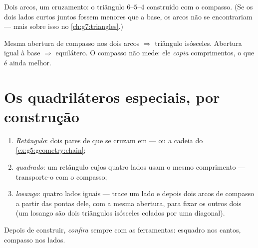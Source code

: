 \begin{omfigure}

{\small Dois arcos, um cruzamento: o triângulo $6$--$5$--$4$
construído com o compasso. (Se os dois lados curtos juntos fossem
menores que a base, os arcos não se encontrariam --- mais sobre isso
no \cref{ch:g7:triangles}.)}
\end{omfigure}

\begin{example}\label{ex:g5:geometry:special}
Mesma abertura de compasso nos dois arcos $\Rightarrow$ triângulo
isósceles. Abertura igual à base $\Rightarrow$ equilátero. O compasso
não mede: ele \emph{copia} comprimentos, o que é ainda melhor.
\end{example}

\section{Os quadriláteros especiais, por construção}

\begin{method}\label{met:g5:geometry:quadrilaterals}
\begin{enumerate}
  \item \emph{Retângulo}: dois pares de  que se cruzam em
         --- ou a cadeia do \cref{ex:g5:geometry:chain};
  \item \emph{quadrado}: um retângulo cujos quatro lados usam o mesmo
        comprimento --- transporte-o com o compasso;
  \item \emph{losango}: quatro lados iguais --- trace um lado e
        depois dois arcos de compasso a partir das pontas dele, com a
        mesma abertura, para fixar os outros dois  (um
        losango são dois triângulos isósceles colados por uma
        diagonal).
\end{enumerate}
Depois de construir, \emph{confira} sempre com as ferramentas:
esquadro nos cantos, compasso nos lados.
\end{method}

